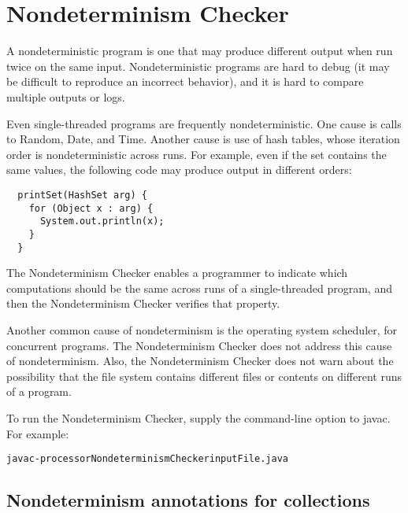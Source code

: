 \htmlhr
\chapter{Nondeterminism Checker\label{nondeterminism-checker}}

A nondeterministic program is one that may produce different output when
run twice on the same input.  Nondeterministic programs are hard to debug
(it may be difficult to reproduce an incorrect behavior), and it is hard to
compare multiple outputs or logs.

Even single-threaded programs are frequently nondeterministic.
One cause is calls to Random, Date, and Time.
Another cause is use of hash tables, whose iteration order is
nondeterministic across runs.
For example, even if the set contains the same values, the following code
may produce output in different orders:

\begin{Verbatim}
  printSet(HashSet arg) {
    for (Object x : arg) {
      System.out.println(x);
    }
  }
\end{Verbatim}

The Nondeterminism Checker enables a programmer to indicate which
computations should be the same across runs of a single-threaded program,
and then the Nondeterminism Checker verifies that property.

Another common cause of nondeterminism is the operating system scheduler,
for concurrent programs.  The Nondeterminism Checker does not address this
cause of nondeterminism.  Also, the Nondeterminism Checker does not warn
about the possibility that the file system contains different files or
contents on different runs of a program.

To run the Nondeterminism Checker, supply the
command-line option to javac.
For example:

\begin{alltt}
	javac -processor NondeterminismChecker inputFile.java
\end{alltt}


\section{Nondeterminism annotations for collections\label{nondeterminism-annotations-collections}}

